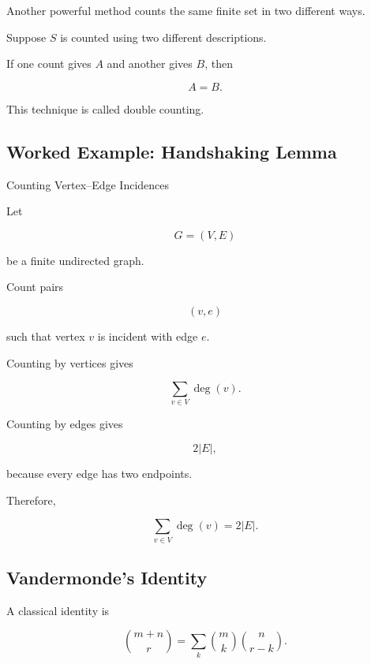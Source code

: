 Another powerful method counts the same finite set in two different
ways.

Suppose \(S\) is counted using two different descriptions.

If one count gives \(A\) and another gives \(B\), then

\[
\boxed{
A=B.
}
\]

This technique is called double counting.

\subsection{Worked Example: Handshaking Lemma}
\label{subsec:worked-double-counting-handshake}

\begin{workedexamplebox}{Counting Vertex--Edge Incidences}

Let

\[
G=(V,E)
\]

be a finite undirected graph.

Count pairs

\[
(v,e)
\]

such that vertex \(v\) is incident with edge \(e\).

Counting by vertices gives

\[
\sum_{v\in V}\deg(v).
\]

Counting by edges gives

\[
2|E|,
\]

because every edge has two endpoints.

Therefore,

\begin{answerbox}
\[
\boxed{
\sum_{v\in V}\deg(v)=2|E|.
}
\]
\end{answerbox}

\end{workedexamplebox}

\subsection{Vandermonde's Identity}
\label{subsec:vandermonde-identity}

A classical identity is

\[
\boxed{
\binom{m+n}{r}
=
\sum_{k}
\binom{m}{k}
\binom{n}{r-k}.
}
\]

